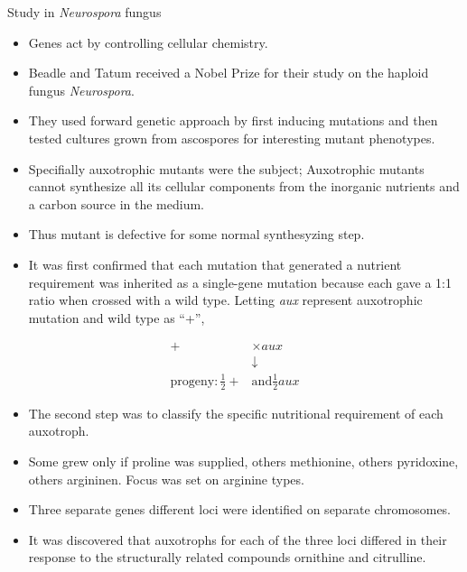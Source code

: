 \documentclass[11pt,dvipsnames,ignorenonframetext,aspectratio=169]{beamer}
\providecommand{\tightlist}{%
  \setlength{\itemsep}{0pt}\setlength{\parskip}{0pt}}
\begin{document}
\begin{frame}{Study in \emph{Neurospora} fungus}
\protect\hypertarget{study-in-neurospora-fungus}{}

\begin{itemize}
\tightlist
\item
  Genes act by controlling cellular chemistry.
\item
  Beadle and Tatum received a Nobel Prize for their study on the haploid
  fungus \emph{Neurospora}.
\item
  They used forward genetic approach by first inducing mutations and
  then tested cultures grown from ascospores for interesting mutant
  phenotypes.
\item
  Specifially auxotrophic mutants were the subject; Auxotrophic mutants
  cannot synthesize all its cellular components from the inorganic
  nutrients and a carbon source in the medium.
\item
  Thus mutant is defective for some normal synthesyzing step.
\end{itemize}

\end{frame}

\begin{frame}{}
\protect\hypertarget{section-6}{}

\begin{itemize}
\tightlist
\item
  It was first confirmed that each mutation that generated a nutrient
  requirement was inherited as a single-gene mutation because each gave
  a 1:1 ratio when crossed with a wild type. Letting \emph{aux}
  represent auxotrophic mutation and wild type as ``+'',
\end{itemize}

\[
\begin{aligned}
+ &\times aux \\
 &\downarrow\\
\textrm{progeny}: \frac{1}{2} + &\textrm{and} \frac{1}{2}aux
\end{aligned}
\]

\begin{itemize}
\tightlist
\item
  The second step was to classify the specific nutritional requirement
  of each auxotroph.
\item
  Some grew only if proline was supplied, others methionine, others
  pyridoxine, others argininen. Focus was set on arginine types.
\item
  Three separate genes different loci were identified on separate
  chromosomes.
\item
  It was discovered that auxotrophs for each of the three loci differed
  in their response to the structurally related compounds ornithine and
  citrulline.
\end{itemize}

\end{frame}
\end{document}

